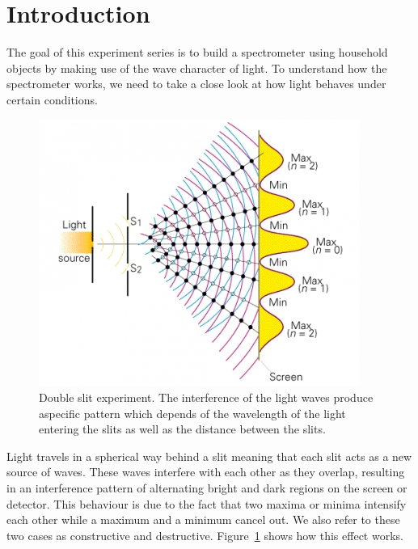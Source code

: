 \section{Introduction}

    

    The goal of this experiment series is to build a spectrometer using household objects by making use of the wave character of light.
    To understand how the spectrometer works, we need to take a close look at how light behaves under certain conditions.

    \begin{figure}[H]
        \centering
        \includegraphics[scale = 0.7]{src/images/interference_double_slit.jpg}
        \caption{Double slit experiment.
        The interference of the light waves produce aspecific pattern which depends of the wavelength of the light entering the slits as well as the distance between the slits.}
        \label{fig_double_slit}
    \end{figure}

    Light travels in a spherical way behind a slit meaning that each slit acts as a new source of waves.
    These waves interfere with each other as they overlap, resulting in an interference pattern of alternating bright and dark regions on the screen or detector.
    This behaviour is due to the fact that two maxima or minima intensify each other while a maximum and a minimum cancel out.
    We also refer to these two cases as constructive and destructive.
    Figure~\ref{fig_double_slit} shows how this effect works.

